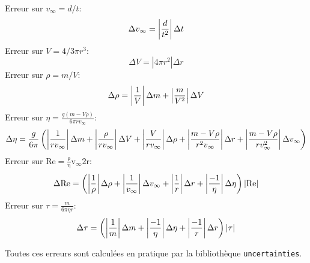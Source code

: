 Erreur sur $v_\infty = d/t$:
\begin{equation}
    \Delta v_\infty = \left|\frac{d}{t^2}\right| \Delta t
\end{equation}
Erreur sur $V = 4/3 \pi r^3$:
\begin{equation}
    \Delta V = \left|4 \pi r^2 \right| \Delta r
\end{equation}
Erreur sur $\rho = m/V$:
\begin{equation}
    \Delta \rho = \left|\frac{1}{V}\right| \Delta m + \left|\frac{m}{V^2}\right| \Delta V
\end{equation}
Erreur sur $\eta = \frac{g(m-V \rho)}{6\pi r v_\infty}$:
\begin{equation}
    \Delta \eta = \frac{g}{6\pi} \left( \left|\frac{1}{r v_\infty}\right| \Delta m + \left|\frac{\rho}{r v_\infty}\right| \Delta V + \left|\frac{V}{r v_\infty}\right| \Delta \rho + \left|\frac{m - V\rho}{r^2 v_\infty}\right|\Delta r + \left|\frac{m - V\rho}{r v_\infty^2}\right|\Delta v_\infty \right)
\end{equation}
Erreur sur $\mathrm{Re = \frac{\rho}{\eta} v_\infty 2r}$:
\begin{equation}
    \Delta \mathrm{Re} = \left(\left|\frac{1}{\rho}\right|\Delta \rho + \left|\frac{1}{v_\infty}\right|\Delta v_\infty + \left|\frac{1}{r}\right| \Delta r + \left|\frac{-1}{\eta}\right| \Delta \eta \right) |\mathrm{Re}|
\end{equation}
Erreur sur $\tau = \frac{m}{6 \pi \eta r}$:
\begin{equation}
    \Delta \tau = \left(\left|\frac{1}{m}\right| \Delta m + \left|\frac{-1}{\eta}\right|\Delta \eta + \left|\frac{-1}{r}\right|\Delta r \right)|\tau|
\end{equation}

Toutes ces erreurs sont calculées en pratique par la bibliothèque \texttt{uncertainties}.
